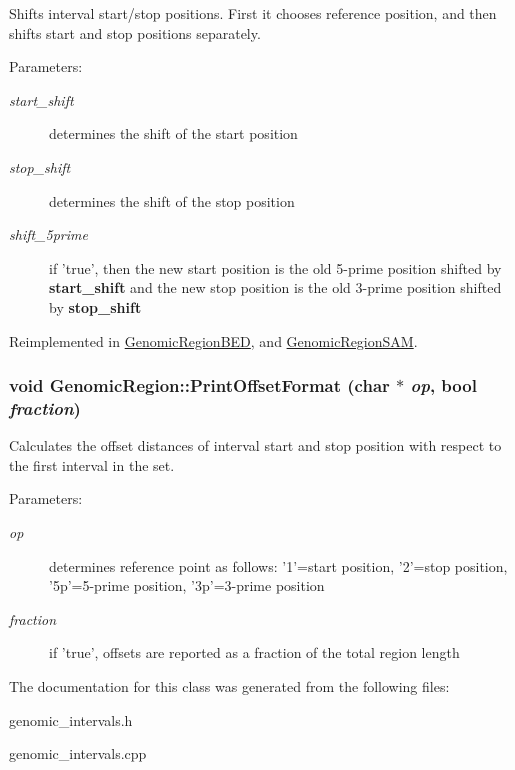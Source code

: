 Shifts interval start/stop positions. First it chooses reference position, and then shifts start and stop positions separately. 

\begin{Desc}
\item[Parameters:]
\begin{description}
\item[{\em start\_\-shift}]determines the shift of the start position \item[{\em stop\_\-shift}]determines the shift of the stop position \item[{\em shift\_\-5prime}]if 'true', then the new start position is the old 5-prime position shifted by {\bf start\_\-shift} and the new stop position is the old 3-prime position shifted by {\bf stop\_\-shift} \end{description}
\end{Desc}


Reimplemented in \hyperlink{classGenomicRegionBED_97d00cb29eb1f379b9e6ee17197530c7}{GenomicRegionBED}, and \hyperlink{classGenomicRegionSAM_c6c559782775bfc65907801148226590}{GenomicRegionSAM}.\hypertarget{classGenomicRegion_33d1e5544b3fb81e8c19468b91920b1d}{
\subsubsection[PrintOffsetFormat]{\setlength{\rightskip}{0pt plus 5cm}void GenomicRegion::PrintOffsetFormat (char $\ast$ {\em op}, \/  bool {\em fraction})}}
\label{classGenomicRegion_33d1e5544b3fb81e8c19468b91920b1d}


Calculates the offset distances of interval start and stop position with respect to the first interval in the set. 

\begin{Desc}
\item[Parameters:]
\begin{description}
\item[{\em op}]determines reference point as follows: '1'=start position, '2'=stop position, '5p'=5-prime position, '3p'=3-prime position \item[{\em fraction}]if 'true', offsets are reported as a fraction of the total region length \end{description}
\end{Desc}


The documentation for this class was generated from the following files:\begin{CompactItemize}
\item 
genomic\_\-intervals.h\item 
genomic\_\-intervals.cpp\end{CompactItemize}

